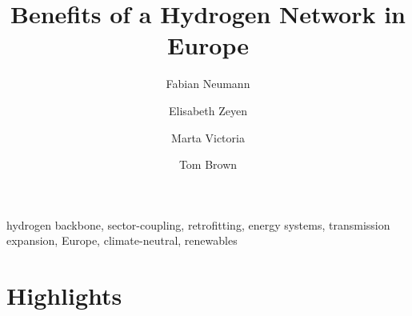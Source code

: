 \documentclass[12pt,preprint]{elsarticle}
\begin{document}
\begin{frontmatter}

	\title{Benefits of a Hydrogen Network in Europe}

	\author[tubaddress]{Fabian Neumann}
	\author[tubaddress]{Elisabeth Zeyen}
	\author[aarhus,aarhus2]{Marta Victoria}
	\author[tubaddress]{Tom Brown}
	\address[tubaddress]{Department of Digital Transformation in Energy Systems, Institute of Energy Technology, Technische Universität Berlin, Fakultät III, Einsteinufer 25 (TA 8), 10587 Berlin, Germany}
	\address[aarhus]{Department of Mechanical and Production Engineering, Aarhus University, Inge Lehmanns Gade 10, 8000 Aarhus, Denmark}
	\address[aarhus2]{iCLIMATE Interdisciplinary Centre for Climate Change, Aarhus University}

	\begin{abstract}
		
	\end{abstract}

	\begin{keyword}
		hydrogen backbone, sector-coupling, retrofitting, energy systems, transmission expansion, Europe, climate-neutral, renewables
	\end{keyword}


\end{frontmatter}


% 

\section*{Highlights}
\end{document}
